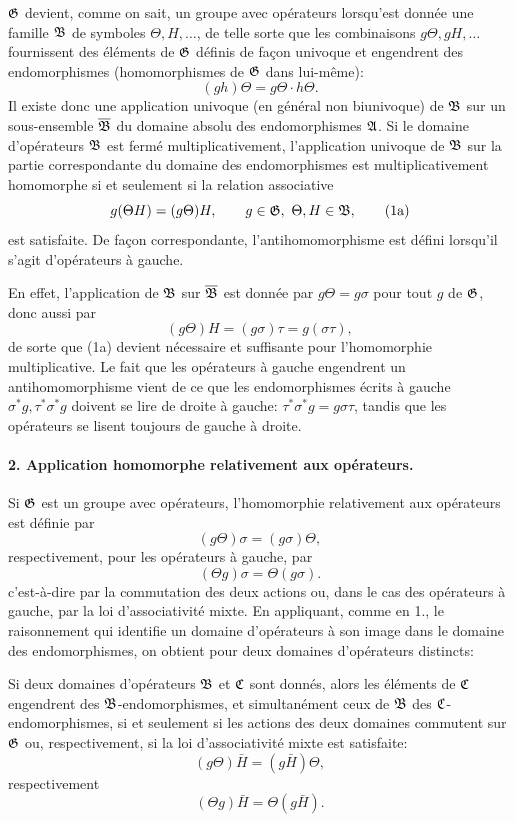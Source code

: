 \(\mathfrak G\) devient, comme on sait, un groupe avec opérateurs lorsqu'est donnée une famille \(\mathfrak B\) de symboles \(\Theta,H,\ldots\), de telle sorte que les combinaisons \(g\Theta,gH,\ldots\) fournissent des éléments de \(\mathfrak G\) définis de façon univoque et engendrent des endomorphismes (homomorphismes de \(\mathfrak G\) dans lui-même):
\[
        (gh)\Theta=g\Theta\cdot h\Theta .
\]
Il existe donc une application univoque (en général non biunivoque) de \(\mathfrak B\) sur un sous-ensemble \(\overline{\mathfrak B}\) du domaine absolu des endomorphismes \(\mathfrak A\). Si le domaine d'opérateurs \(\mathfrak B\) est fermé multiplicativement, l'application univoque de \(\mathfrak B\) sur la partie correspondante du domaine des endomorphismes est multiplicativement homomorphe si et seulement si la relation associative
\[
        g(\Theta H)=(g\Theta)H, \qquad g\in\frG,\ \Theta,H\in\frB,                       \tag{1a}
\]
est satisfaite. De façon correspondante, l'antihomomorphisme est défini lorsqu'il s'agit d'opérateurs à gauche.

En effet, l'application de \(\mathfrak B\) sur \(\overline{\mathfrak B}\) est donnée par \(g\Theta=g\sigma\) pour tout \(g\) de \(\mathfrak G\), donc aussi par
\[
        (g\Theta)H=(g\sigma)\tau=g(\sigma\tau),
\]
de sorte que (1a) devient nécessaire et suffisante pour l'homomorphie multiplicative. Le fait que les opérateurs à gauche engendrent un antihomomorphisme vient de ce que les endomorphismes écrits à gauche \(\sigma^\ast g,\tau^\ast\sigma^\ast g\) doivent se lire de droite à gauche: \(\tau^\ast\sigma^\ast g=g\sigma\tau\), tandis que les opérateurs se lisent toujours de gauche à droite.

\paragraph{2. Application homomorphe relativement aux opérateurs.}
Si \(\mathfrak G\) est un groupe avec opérateurs, l'homomorphie relativement aux opérateurs est définie par
\[
        (g\Theta)\sigma=(g\sigma)\Theta,                                          \tag{2}
\]
respectivement, pour les opérateurs à gauche, par
\[
        (\Theta g)\sigma=\Theta(g\sigma).                                          \tag{2*}
\]
c'est-à-dire par la commutation des deux actions ou, dans le cas des opérateurs à gauche, par la loi d'associativité mixte. En appliquant, comme en 1., le raisonnement qui identifie un domaine d'opérateurs à son image dans le domaine des endomorphismes, on obtient pour deux domaines d'opérateurs distincts:

Si deux domaines d'opérateurs \(\mathfrak B\) et \(\mathfrak C\) sont donnés, alors les éléments de \(\mathfrak C\) engendrent des \(\mathfrak B\)-endomorphismes, et simultanément ceux de \(\mathfrak B\) des \(\mathfrak C\)-endomorphismes, si et seulement si les actions des deux domaines commutent sur \(\mathfrak G\) ou, respectivement, si la loi d'associativité mixte est satisfaite:
\[
        (g\Theta)\bar H=(g\bar H)\Theta,                                                    \tag{2a}
\]
respectivement
\[
        (\Theta g)\bar H=\Theta(g\bar H).                               \tag{2a*}
\]

